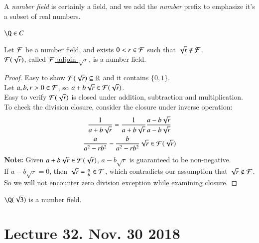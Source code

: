 \documentclass[10pt]{article}
\begin{document}
		\begin{remark}
			A \emph{number field} is certainly a field, and we add the \emph{number} prefix to emphasize it's a subset of real numbers.
		\end{remark}
		
		\begin{example}
			$\Q \in C$
		\end{example}
		
		\begin{proposition}
			Let $\mathcal{{F}}$ be a number field, and exists $0 < r \in \mathcal{{F}}$ such that $\sqrt{r} \notin \mathcal{{F}}$.\\
			$\mathcal{{F}}(\sqrt{r})$, called \ul{$\mathcal{{F}}$ adjoin $\sqrt{r}$}, is a number field.
		\end{proposition}
		\begin{proof}
			Easy to show $\mathcal{{F}}(\sqrt{r}) \subseteq \mathbb{R}$ and it contains $\{0,1\}$. \\
			Let $a, b, r>0 \in \mathcal{{F}}$, so $a + b \sqrt{r} \in \mathcal{{F}}(\sqrt{r})$. \\
			Easy to verify $\mathcal{{F}}(\sqrt{r})$ is closed under addition, subtraction and multiplication. \\
			To check the division closure, consider the closure under inverse operation:
			\begin{gather*}
				\frac{1}{a + b \sqrt{r}} = \frac{1}{a + b \sqrt{r}} \frac{a - b \sqrt{r}}{a - b \sqrt{r}} \\
				\frac{a}{a^2 - r b^2} - \frac{b}{a^2 - rb^2} \sqrt{r} \in \mathcal{{F}}(\sqrt{r})
			\end{gather*}
			\textbf{Note:} Given $a + b \sqrt{r} \in \mathcal{{F}}(\sqrt{r})$, $a - b \sqrt{r}$ is guaranteed to be non-negative. \\
			If $a - b \sqrt{r} = 0$, then $\sqrt{r} = \frac{a}{b} \in \mathcal{{F}}$, which contradicts our assumption that $\sqrt{r} \notin \mathcal{{F}}$. So we will not encounter zero division exception while examining closure.
		\end{proof}
		
		\begin{example}
			$\Q(\sqrt{3})$ is a number field.
		\end{example}
	
	\section{Lecture 32. Nov. 30 2018}
\end{document}
